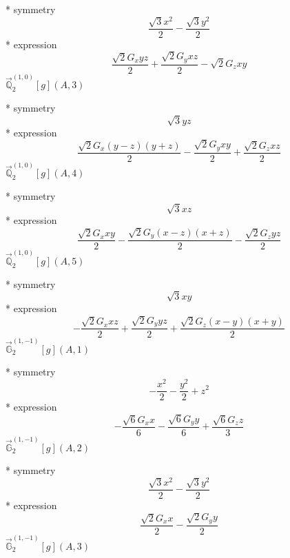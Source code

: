 \documentclass[fleqn,8pt]{jsarticle}
\begin{document}
\noindent\quad ** symmetry
\begin{dmath*}
\frac{\sqrt{3} x^{2}}{2} - \frac{\sqrt{3} y^{2}}{2}
\end{dmath*}
\noindent\quad ** expression
\begin{dmath*}
\frac{\sqrt{2} G_{x} y z}{2} + \frac{\sqrt{2} G_{y} x z}{2} - \sqrt{2} G_{z} x y
\end{dmath*}
\noindent\quad $\vec{\mathbb{Q}}_{2}^{(1,0)}[g](A,3)$

\noindent\quad ** symmetry
\begin{dmath*}
\sqrt{3} y z
\end{dmath*}
\noindent\quad ** expression
\begin{dmath*}
\frac{\sqrt{2} G_{x} \left(y - z\right) \left(y + z\right)}{2} - \frac{\sqrt{2} G_{y} x y}{2} + \frac{\sqrt{2} G_{z} x z}{2}
\end{dmath*}
\noindent\quad $\vec{\mathbb{Q}}_{2}^{(1,0)}[g](A,4)$

\noindent\quad ** symmetry
\begin{dmath*}
\sqrt{3} x z
\end{dmath*}
\noindent\quad ** expression
\begin{dmath*}
\frac{\sqrt{2} G_{x} x y}{2} - \frac{\sqrt{2} G_{y} \left(x - z\right) \left(x + z\right)}{2} - \frac{\sqrt{2} G_{z} y z}{2}
\end{dmath*}
\noindent\quad $\vec{\mathbb{Q}}_{2}^{(1,0)}[g](A,5)$

\noindent\quad ** symmetry
\begin{dmath*}
\sqrt{3} x y
\end{dmath*}
\noindent\quad ** expression
\begin{dmath*}
- \frac{\sqrt{2} G_{x} x z}{2} + \frac{\sqrt{2} G_{y} y z}{2} + \frac{\sqrt{2} G_{z} \left(x - y\right) \left(x + y\right)}{2}
\end{dmath*}
\noindent\quad $\vec{\mathbb{G}}_{2}^{(1,-1)}[g](A,1)$

\noindent\quad ** symmetry
\begin{dmath*}
- \frac{x^{2}}{2} - \frac{y^{2}}{2} + z^{2}
\end{dmath*}
\noindent\quad ** expression
\begin{dmath*}
- \frac{\sqrt{6} G_{x} x}{6} - \frac{\sqrt{6} G_{y} y}{6} + \frac{\sqrt{6} G_{z} z}{3}
\end{dmath*}
\noindent\quad $\vec{\mathbb{G}}_{2}^{(1,-1)}[g](A,2)$

\noindent\quad ** symmetry
\begin{dmath*}
\frac{\sqrt{3} x^{2}}{2} - \frac{\sqrt{3} y^{2}}{2}
\end{dmath*}
\noindent\quad ** expression
\begin{dmath*}
\frac{\sqrt{2} G_{x} x}{2} - \frac{\sqrt{2} G_{y} y}{2}
\end{dmath*}
\noindent\quad $\vec{\mathbb{G}}_{2}^{(1,-1)}[g](A,3)$
\end{document}
